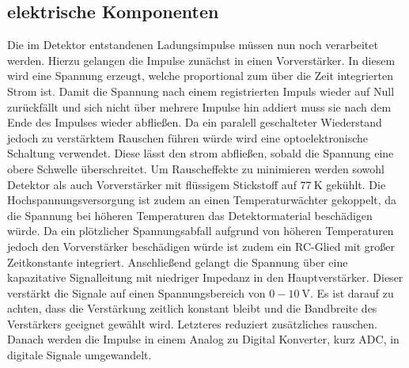 \subsection{elektrische Komponenten}
Die im Detektor entstandenen Ladungsimpulse müssen nun noch verarbeitet werden. Hierzu gelangen die Impulse zunächst in einen Vorverstärker. In diesem wird eine Spannung erzeugt, welche proportional zum über die Zeit integrierten Strom ist. Damit die Spannung nach einem registrierten Impuls wieder auf Null zurückfällt und sich nicht über mehrere Impulse hin addiert muss sie nach dem Ende des Impulses wieder abfließen. Da ein paralell geschalteter Wiederstand jedoch zu verstärktem Rauschen führen würde wird eine optoelektronische Schaltung verwendet. Diese lässt den strom abfließen, sobald die Spannung eine obere Schwelle überschreitet. Um Rauscheffekte zu minimieren werden sowohl Detektor als auch Vorverstärker mit flüssigem Stickstoff auf $\SI{77}{\kelvin}$ gekühlt. Die Hochspannungsversorgung ist zudem an einen Temperaturwächter gekoppelt, da die Spannung bei höheren Temperaturen das Detektormaterial beschädigen würde. Da ein plötzlicher Spannungsabfall aufgrund von höheren Temperaturen jedoch den Vorverstärker beschädigen würde ist zudem ein RC-Glied mit großer Zeitkonstante integriert. Anschließend gelangt die Spannung über eine kapazitative Signalleitung mit niedriger Impedanz in den Hauptverstärker. Dieser verstärkt die Signale auf einen Spannungsbereich von $0 - \SI{10}{\volt}$. Es ist darauf zu achten, dass die Verstärkung zeitlich konstant bleibt und die Bandbreite des Verstärkers geeignet gewählt wird. Letzteres reduziert zusätzliches rauschen. Danach werden die Impulse in einem Analog zu Digital Konverter, kurz ADC, in digitale Signale umgewandelt.

